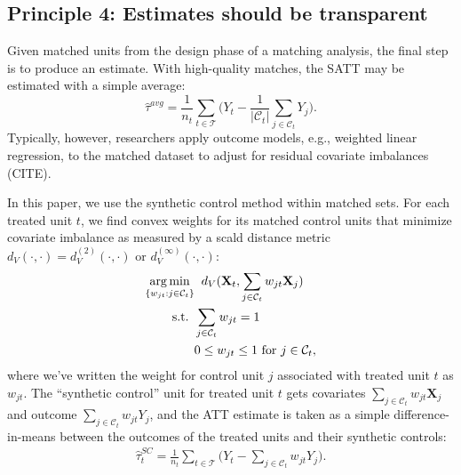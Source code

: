 \documentclass{article}
\newcommand{\Xt}{\mathbf{X}_t}
\newcommand{\Xj}{\mathbf{X}_j}
\newcommand{\Ct}{\mathcal{C}_{t}}
\DeclareMathOperator*{\argmin}{arg\,min}
\begin{document}

\subsection{Principle 4: Estimates should be transparent}

Given matched units from the design phase of a matching analysis, the final step is to produce an estimate.
With high-quality matches, the SATT may be estimated with a simple average:
$$\hat{\tau}^{avg} = \frac{1}{n_t} \sum_{t \in \mathcal{T}} \big( Y_t - \frac{1}{|\Ct|} \sum_{j \in \Ct} Y_j \big).$$
Typically, however, researchers apply outcome models, e.g., weighted linear regression, to the matched dataset to adjust for residual covariate imbalances (CITE).

In this paper, we use the synthetic control method \citep[SCM; ][]{abadie2010synthetic} within matched sets.
For each treated unit $t$, we find convex weights for its matched control units that minimize covariate imbalance as measured by a scald distance metric $d_V(\cdot, \cdot) = d_V^{(2)}(\cdot, \cdot)$ or $d_V^{(\infty)}(\cdot, \cdot)$:
\begin{align*}
    \argmin_{\{w_{jt} : j \in \Ct\}} 
        &\hspace{2mm} d_V(\Xt, \sum_{j \in \Ct}w_{jt} \Xj) \\
    \text{s.t. } 
        &\sum_{j \in \Ct} w_{jt} = 1 \\
        &0 \leq w_{jt} \leq 1 \text{ for } j \in \mathcal{C}_t,
\end{align*}
where we've written the weight for control unit $j$ associated with treated unit $t$ as $w_{jt}$.
The ``synthetic control'' unit for treated unit $t$ gets covariates $\sum_{j \in \Ct}w_{jt} \Xj$ and outcome $\sum_{j \in \Ct}w_{jt} Y_j$,
and the ATT estimate is taken as a simple difference-in-means between the outcomes of the treated units and their synthetic controls:
\begin{align*}
    \hat{\tau}_t^{SC} = \frac{1}{n_t} \sum_{t \in \mathcal{T}} \big(Y_t - \sum_{j \in \Ct} w_{jt} Y_j \big).
\end{align*}
\end{document}
